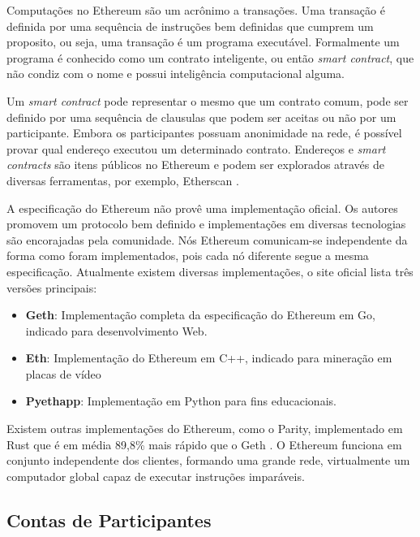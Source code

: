 \documentclass[tcc,capa]{texufpel}
\begin{document}
    Computações no Ethereum são um acrônimo a transações. Uma transação é definida por uma sequência de instruções bem definidas que cumprem um proposito, ou seja, uma transação é um programa executável. Formalmente um programa é conhecido como um contrato inteligente, ou então \textit{smart contract}, que não condiz com o nome e possui inteligência computacional alguma. 
    
    Um \textit{smart contract} pode representar o mesmo que um contrato comum, pode ser definido por uma sequência de clausulas que podem ser aceitas ou não por um participante. Embora os participantes possuam anonimidade na rede, é possível provar qual endereço executou um determinado contrato. Endereços e \textit{smart contracts} são itens públicos no Ethereum e podem ser explorados através de diversas ferramentas, por exemplo, Etherscan \cite{team2017etherscan}.
    
    A especificação do Ethereum não provê uma implementação oficial. Os autores promovem um protocolo bem definido e implementações em diversas tecnologias são encorajadas pela comunidade. Nós Ethereum comunicam-se independente da forma como foram implementados, pois cada nó diferente segue a mesma especificação. Atualmente existem diversas implementações, o site oficial lista três versões principais:
    
    \begin{itemize}
        \item \textbf{Geth}: Implementação completa da especificação do Ethereum em Go, indicado para desenvolvimento Web.
        \item \textbf{Eth}: Implementação do Ethereum em C++, indicado para mineração em placas de vídeo
        \item \textbf{Pyethapp}: Implementação em Python para fins educacionais.
    \end{itemize}
    
    Existem outras implementações do Ethereum, como o Parity, implementado em Rust que é em média 89,8\% mais rápido que o Geth \cite{rouhaniperformance}. O Ethereum funciona em conjunto independente dos clientes, formando uma grande rede, virtualmente um computador global capaz de executar instruções imparáveis.
    
    
	\subsection{Contas de Participantes}\label{ssc:contas-de-participantes}
	
\end{document}
